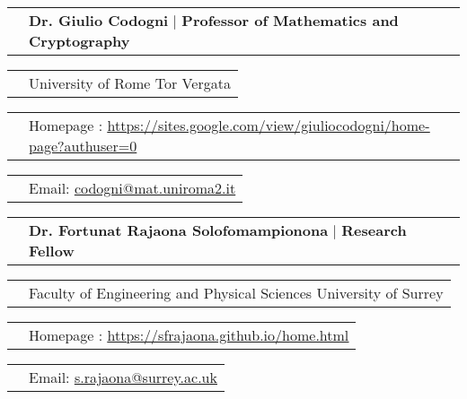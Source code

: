 \documentclass[11pt]{article}
\newcommand{\cvRefTitle}[2]{\begin{tabular}{>{\raggedleft\arraybackslash}p{3cm}>{\raggedright\arraybackslash}p{16cm}}
		 & \textbf{#1} $|$ \textbf{#2}  \\
\end{tabular}}
\newcommand{\cvRefEntry}[1]{\begin{tabular}{>{\raggedleft\arraybackslash}p{3cm}>{\raggedright\arraybackslash}p{16cm}}
		& #1 \\
\end{tabular}}
\begin{document}
\cvRefTitle{Dr. Giulio Codogni}{Professor of Mathematics and Cryptography}


\cvRefEntry{University of Rome Tor Vergata}


\cvRefEntry{Homepage : \href{https://sites.google.com/view/giuliocodogni/home-page?authuser=0}{\color{mauveMoyen}\underline{https://sites.google.com/view/giuliocodogni/home-page?authuser=0}}}



\cvRefEntry{Email: \href{mailto:codogni@mat.uniroma2.it}{\color{mauveMoyen}\underline{codogni@mat.uniroma2.it}}}

\vspace*{15pt}
\cvRefTitle{Dr. Fortunat Rajaona Solofomampionona}{Research Fellow}


\cvRefEntry{Faculty of Engineering and Physical Sciences University of Surrey
}


\cvRefEntry{Homepage : \href{https://sfrajaona.github.io/home.html}{\color{mauveMoyen}\underline{https://sfrajaona.github.io/home.html}}}



\cvRefEntry{Email: \href{mailto:s.rajaona@surrey.ac.uk}{\color{mauveMoyen}\underline{s.rajaona@surrey.ac.uk}}}
\vspace*{15pt}

%
%
%
%
%
%
%
\end{document}
